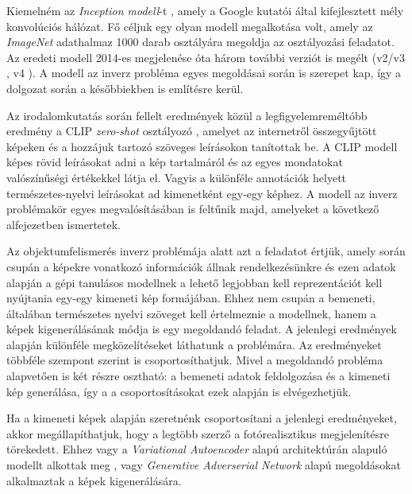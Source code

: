 
Kiemelném az \textit{Inception modell}-t \cite{szegedy2015going}, amely a Google kutatói által kifejlesztett mély konvolúciós hálózat. Fő céljuk egy olyan modell megalkotása volt, amely az \textit{ImageNet} adathalmaz \cite{deng2009imagenet} 1000 darab osztályára megoldja az osztályozási feladatot. Az eredeti modell 2014-es megjelenése óta három további verziót is megélt (v2/v3 \cite{szegedy2016rethinking}, v4 \cite{szegedy2017inception}). A modell az inverz probléma egyes megoldásai során is szerepet kap, így a dolgozat során a későbbiekben is említésre kerül.

Az irodalomkutatás során fellelt eredmények közül a legfigyelemreméltóbb eredmény a CLIP \textit{zero-shot} osztályozó \cite{radford2021learning}, amelyet az internetről összegyűjtött képeken és a hozzájuk tartozó szöveges leírásokon tanítottak be. A CLIP modell képes rövid leírásokat adni a kép tartalmáról és az egyes mondatokat valószínűségi értékekkel látja el. Vagyis a különféle annotációk helyett természetes-nyelvi leírásokat ad kimenetként egy-egy képhez. A modell az inverz problémakör egyes megvalósításában is feltűnik majd, amelyeket a következő alfejezetben ismertetek.


Az objektumfelismerés inverz problémája alatt azt a feladatot értjük, amely során csupán a képekre vonatkozó információk állnak rendelkezésünkre és ezen adatok alapján a gépi tanulásos modellnek a lehető legjobban kell reprezentációt kell nyújtania egy-egy kimeneti kép formájában.
Ehhez nem csupán a bemeneti, általában természetes nyelvi szöveget kell értelmeznie a modellnek, hanem a képek kigenerálásának módja is egy megoldandó feladat.
A jelenlegi eredmények alapján különféle megközelítéseket láthatunk a problémára. Az eredményeket többféle szempont szerint is csoportosíthatjuk. Mivel a megoldandó probléma alapvetően is két részre osztható: a bemeneti adatok feldolgozása és a kimeneti kép generálása, így a a csoportosításokat ezek alapján is elvégezhetjük.

Ha a kimeneti képek alapján szeretnénk csoportosítani a jelenlegi eredményeket, akkor megállapíthatjuk, hogy a legtöbb szerző a fotórealisztikus megjelenítésre törekedett. Ehhez vagy a \textit{Variational Autoencoder} alapú architektúrán alapuló modellt alkottak meg \cite{ramesh2021zero}, vagy \textit{Generative Adverserial Network} alapú megoldásokat \cite{dong2021unsupervised, reed2016learning, xu2018attngan, zhang2017stackgan} alkalmaztak a képek kigenerálására.

